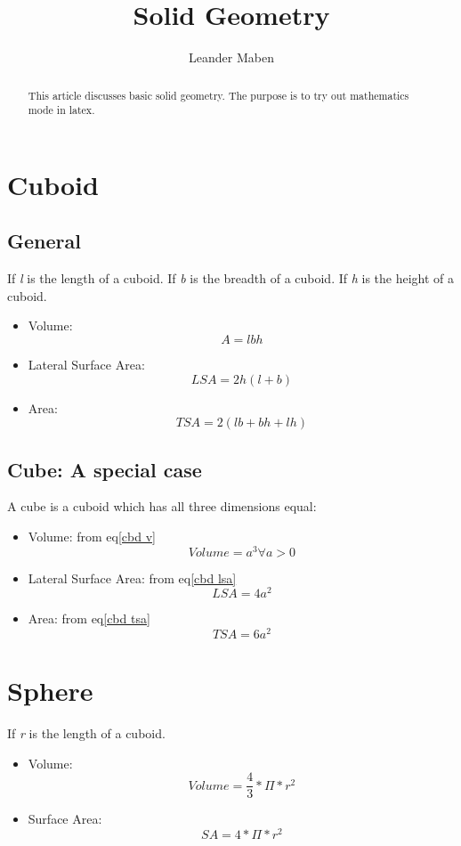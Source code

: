 \documentclass[a4paper,11pt]{article}
\title{Solid Geometry}
\author{Leander Maben}
\begin{document}
\maketitle
\tableofcontents

\begin{abstract}
This article discusses basic solid geometry.
The purpose is to try out mathematics mode in latex.
\end{abstract}

\section{Cuboid}
\subsection{General}

If \emph{l} is the length of a cuboid.
If \emph{b} is the breadth of a cuboid.
If \emph{h} is the height of a cuboid.

\begin{itemize}

\item Volume:
\begin{equation}
\label{cbd v}
A=lbh
\end{equation}
\item Lateral Surface Area:
\begin{equation}
\label{cbd lsa}
LSA=2h(l+b)
\end{equation}
\item Area:
\begin{equation}
\label{cbd tsa}
TSA=2(lb+bh+lh)
\end{equation}
\end{itemize}
\subsection{Cube: A special case}
A cube is a cuboid which has all three dimensions equal:
\begin{itemize}
\item Volume:
from eq\ref{cbd v}
\begin{equation}
\label{cb v}
Volume=a^3 \forall a>0
\end{equation}
\item Lateral Surface Area:
from eq\ref{cbd lsa}
\begin{equation}
\label{cb lsa}
LSA=4a^2
\end{equation}
\item Area:
from eq\ref{cbd tsa}
\begin{equation}
\label{cb tsa}
TSA=6a^2
\end{equation}
\end{itemize}
\section{Sphere}
If \emph{r} is the length of a cuboid.
\begin{itemize}

\item Volume:
\begin{equation}
Volume=\frac{4}{3}*\Pi*r^2
\end{equation}
\item Surface Area:
\begin{equation}
SA=4*\Pi*r^2
\end{equation}

\end{itemize}
\end{document}
